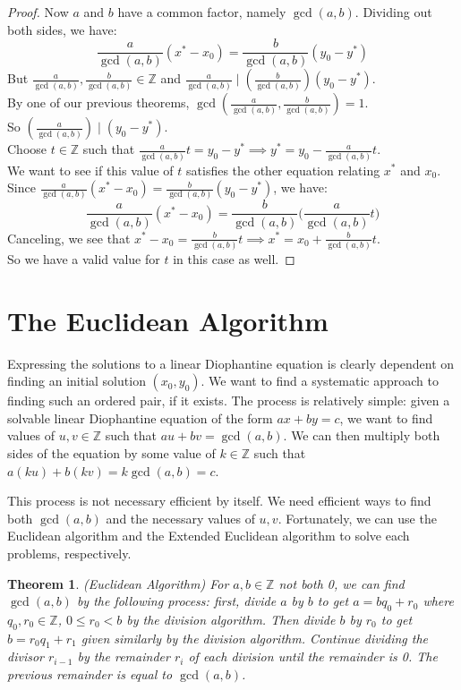 \documentclass[11pt]{amsart}
\newtheorem{theorem}{Theorem}[section]
\theoremstyle{definition}
\newcommand{\integers}{\mathbb{Z}}
\begin{document}
\begin{proof}
	Now $a$ and $b$ have a common factor, namely $\gcd(a, b)$. Dividing out both sides, we have:
	\[ \frac{a}{\gcd(a, b)}(x^* - x_0) = \frac{b}{\gcd(a, b)}(y_0 - y^*) \]
	But $\frac{a}{\gcd(a, b)}, \frac{b}{\gcd(a, b)} \in \integers$ and $\frac{a}{\gcd(a, b)} \mid (\frac{b}{\gcd(a, b)})(y_0 - y^*)$. \\
	By one of our previous theorems, $\gcd(\frac{a}{\gcd(a, b)}, \frac{b}{\gcd(a, b)}) = 1$. \\
	So $(\frac{a}{\gcd(a, b)}) \mid (y_0 - y^*)$. \\
	Choose $t \in \integers$ such that $\frac{a}{\gcd(a, b)}t = y_0 - y^* \implies y^* = y_0 - \frac{a}{\gcd(a, b)}t$. \\
	We want to see if this value of $t$ satisfies the other equation relating $x^*$ and $x_0$. \\
	Since $\frac{a}{\gcd(a, b)}(x^* - x_0) = \frac{b}{\gcd(a, b)}(y_0 - y^*)$, we have:
	\[ \frac{a}{\gcd(a, b)}(x^* - x_0) = \frac{b}{\gcd(a, b)}\Big(\frac{a}{\gcd(a, b)}t\Big) \]
	Canceling, we see that $x^* - x_0 = \frac{b}{\gcd(a, b)}t \implies x^* = x_0 + \frac{b}{\gcd(a, b)}t$. \\
	So we have a valid value for $t$ in this case as well.
\end{proof}

\newpage
\section{The Euclidean Algorithm}
Expressing the solutions to a linear Diophantine equation is clearly dependent on finding an initial solution $(x_0, y_0)$. We want to find a
systematic approach to finding such an ordered pair, if it exists. The process is relatively simple: given a solvable linear Diophantine equation
of the form $ax + by = c$, we want to find values of $u, v \in \integers$ such that $au + bv = \gcd(a, b)$. We can then multiply both sides of the
equation by some value of $k \in \integers$ such that $a(ku) + b(kv) = k\gcd(a, b) = c$. 

This process is not necessary efficient by itself. We need efficient ways to find both $\gcd(a, b)$ and the necessary values of $u, v$. Fortunately,
we can use the Euclidean algorithm and the Extended Euclidean algorithm to solve each problems, respectively.
\begin{theorem}(Euclidean Algorithm)
	For $a, b \in \integers$ not both 0, we can find $\gcd(a, b)$ by the following process: first, divide $a$ by $b$ to get $a = bq_0 + r_0$
	where $q_0, r_0 \in \integers$, $0 \leq r_0 < b$ by the division algorithm. Then divide $b$ by $r_0$ to get $b = r_0q_1 + r_1$ given 
	similarly by the division algorithm. Continue dividing the divisor $r_{i - 1}$ by the remainder $r_i$ of each division until the remainder
	is 0. The previous remainder is equal to $\gcd(a, b)$.
\end{theorem}
\end{document}

